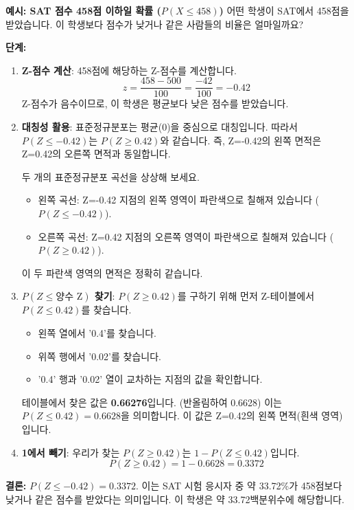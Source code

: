 \documentclass[11pt,a4paper]{book}
\theoremstyle{definition}
\begin{document}
\begin{examplebox}
\textbf{예시: SAT 점수 458점 이하일 확률 ($P(X \le 458)$)}
어떤 학생이 SAT에서 458점을 받았습니다. 이 학생보다 점수가 낮거나 같은 사람들의 비율은 얼마일까요?

\textbf{단계:}
\begin{enumerate}
    \item \textbf{Z-점수 계산}: 458점에 해당하는 Z-점수를 계산합니다.
    \[ z = \frac{458 - 500}{100} = \frac{-42}{100} = -0.42 \]
    Z-점수가 음수이므로, 이 학생은 평균보다 낮은 점수를 받았습니다.
    \item \textbf{대칭성 활용}: 표준정규분포는 평균(0)을 중심으로 대칭입니다. 따라서 $P(Z \le -0.42)$는 $P(Z \ge 0.42)$와 같습니다. 즉, Z=-0.42의 왼쪽 면적은 Z=0.42의 오른쪽 면적과 동일합니다.
    \begin{tcolorbox}[title={\textbf{시각적 이해: 대칭성}, colback=lightblue!50!white, colframe=darkblue}]
    두 개의 표준정규분포 곡선을 상상해 보세요.
    \begin{itemize}
        \item 왼쪽 곡선: Z=-0.42 지점의 왼쪽 영역이 파란색으로 칠해져 있습니다 ($P(Z \le -0.42)$).
        \item 오른쪽 곡선: Z=0.42 지점의 오른쪽 영역이 파란색으로 칠해져 있습니다 ($P(Z \ge 0.42)$).
    \end{itemize}
    이 두 파란색 영역의 면적은 정확히 같습니다.
    \end{tcolorbox}
    \item \textbf{$P(Z \le \text{양수 Z})$ 찾기}: $P(Z \ge 0.42)$를 구하기 위해 먼저 Z-테이블에서 $P(Z \le 0.42)$를 찾습니다.
    \begin{itemize}
        \item 왼쪽 열에서 '0.4'를 찾습니다.
        \item 위쪽 행에서 '0.02'를 찾습니다.
        \item '0.4' 행과 '0.02' 열이 교차하는 지점의 값을 확인합니다.
    \end{itemize}
    테이블에서 찾은 값은 \textbf{0.66276}입니다. (반올림하여 0.6628)
    이는 $P(Z \le 0.42) = 0.6628$을 의미합니다. 이 값은 Z=0.42의 왼쪽 면적(흰색 영역)입니다.
    \item \textbf{1에서 빼기}: 우리가 찾는 $P(Z \ge 0.42)$는 $1 - P(Z \le 0.42)$입니다.
    \[ P(Z \ge 0.42) = 1 - 0.6628 = 0.3372 \]
\end{enumerate}
\textbf{결론:} $P(Z \le -0.42) = 0.3372$. 이는 SAT 시험 응시자 중 약 33.72\%가 458점보다 낮거나 같은 점수를 받았다는 의미입니다. 이 학생은 약 33.72백분위수에 해당합니다.
\end{examplebox}
\end{document}
